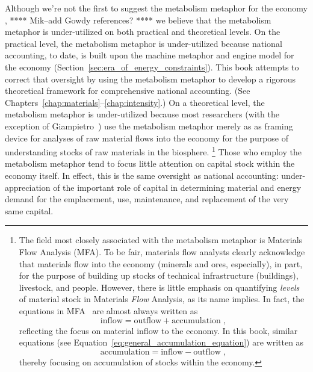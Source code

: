 Although we're not the first to suggest the metabolism metaphor for the economy
\cite{Liu2012, Giampietro2000, Giampietro2013, F-K1999, F-K2003, Heijman:1988aa},
**** Mik--add Gowdy references? ****
we believe that
the metabolism metaphor is under-utilized 
on both practical and theoretical levels.
On the practical level, the metabolism metaphor is under-utilized
because national accounting, to date, 
is built upon the machine metaphor and engine model for the economy
(Section~\ref{sec:era_of_energy_constraints}).
This book attempts to correct that oversight 
by using the metabolism metaphor 
to develop a rigorous theoretical framework 
for comprehensive national accounting.
(See Chapters~\ref{chap:materials}--\ref{chap:intensity}.)
On a theoretical level, the metabolism metaphor is under-utilized because 
most researchers (with the exception of Giampietro~\cite{Giampietro2000, Giampietro2013})
use the metabolism metaphor merely as as framing device for analyses of
raw material flows into the economy for the purpose of understanding 
stocks of raw materials in the biosphere.%
	\footnote{The field most closely associated with the metabolism metaphor is
	Materials Flow Analysis (MFA). 
	To be fair, materials flow analysts clearly acknowledge that 
	materials flow into the economy (minerals and ores, especially),
	in part,
	for the purpose of building up stocks of technical infrastructure (buildings),
	livestock, and people.\cite[p.~116]{F-K1999} 
	However, there is little emphasis on quantifying \emph{levels} 
	of material stock in Materials \emph{Flow} Analysis, 
	as its name implies.
	In fact, the equations in MFA~\cite[Equation~1]{F-K1999} are almost always written as%
	\begin{equation*}
		\mathrm{inflow} = \mathrm{outflow} + \mathrm{accumulation \; ,}
	\end{equation*}
	reflecting the focus on material inflow to the economy.
	In this book, similar equations 
	(see Equation~\ref{eq:general_accumulation_equation}) 
	are written as%
	\begin{equation*}
		\mathrm{accumulation} = \mathrm{inflow} - \mathrm{outflow \; ,}
	\end{equation*}
	thereby focusing on accumulation of stocks within the economy.
	}
Those who employ the metabolism metaphor
tend to focus little attention on capital stock within the economy itself.
In effect, this is the same oversight as national accounting: 
under-appreciation of the important role of capital
in determining material and energy demand 
for the emplacement, use, maintenance, and replacement of the very same capital.

